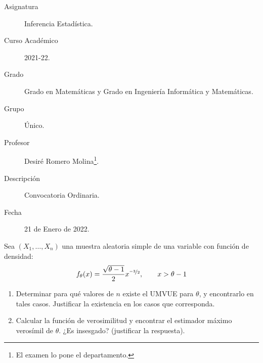 \documentclass[12pt]{article}
\begin{document}

    
    

    \begin{description}
        \item[Asignatura] Inferencia Estadística.
        \item[Curso Académico] 2021-22.
        \item[Grado] Grado en Matemáticas y Grado en Ingeniería Informática y Matemáticas.
        \item[Grupo] Único.
        \item[Profesor] Desiré Romero Molina\footnote{El examen lo pone el departamento.}.
        \item[Descripción] Convocatoria Ordinaria.
        \item[Fecha] 21 de Enero de 2022.  
    \end{description}
    \newpage



    \begin{ejercicio}[2.5 puntos]
        Sea $(X_1,\ldots,X_n)$ una muestra aleatoria simple de una variable con función de densidad:
        \begin{equation*}
            f_\theta(x) = \frac{\sqrt{\theta-1}}{2}x^{\nicefrac{-3}{2}}, \qquad x>\theta-1
        \end{equation*}
        \begin{enumerate}[label=\alph*)]
            \item Determinar para qué valores de $n$ existe el UMVUE para $\theta$, y encontrarlo en tales casos. Justificar la existencia en los casos que corresponda.
            \item Calcular la función de verosimilitud y encontrar el estimador máximo verosímil de $\theta$. ¿Es insesgado? (justificar la respuesta).
        \end{enumerate}
    \end{ejercicio}
\end{document}
